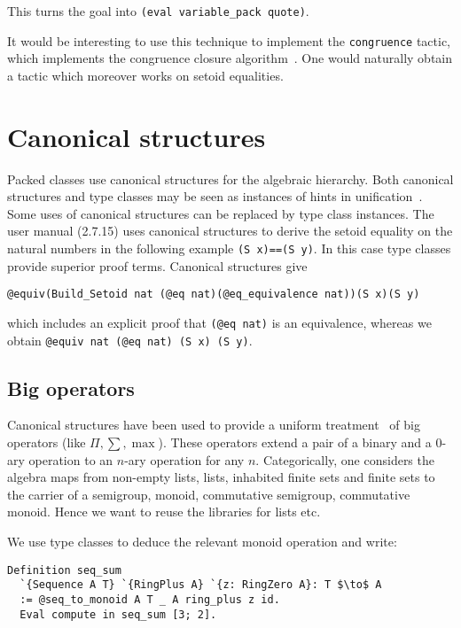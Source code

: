 \documentclass[a4paper,10pt,runningheads]{llncs}
\begin{document}
This turns the goal into \lstinline|(eval variable_pack quote)|.

It would be interesting to use this technique to implement the \lstinline|congruence| tactic, which implements
the congruence closure algorithm~\cite{corbineau2007deciding}. One would naturally obtain a tactic
which moreover works on setoid equalities.

\section{Canonical structures}\label{canonical}
Packed classes use canonical structures for the algebraic hierarchy. Both canonical structures and
type classes may be seen as instances of hints in unification~\cite{Hints}. Some uses of canonical
structures can be replaced by type class instances. The user manual (2.7.15) uses canonical
structures to derive the setoid equality on the natural
numbers in the following example \lstinline|(S x)==(S y)|. In this case type classes provide superior proof
terms. Canonical structures give
\begin{lstlisting}
@equiv(Build_Setoid nat (@eq nat)(@eq_equivalence nat))(S x)(S y)
\end{lstlisting}

which includes an explicit proof that \lstinline|(@eq nat)| is an equivalence,
whereas we obtain \lstinline|@equiv nat (@eq nat) (S x) (S y)|.

\subsection{Big operators}
Canonical structures have been used to provide a uniform treatment~\cite{bertot2008canonical} of big
operators (like $\Pi,\sum, \max$). These operators extend a pair of a binary and a 0-ary operation
to an $n$-ary operation for any $n$. Categorically, one considers the algebra maps from non-empty
lists, lists, inhabited finite sets and finite sets to the carrier of a semigroup, monoid,
commutative semigroup, commutative monoid. Hence we want to reuse the libraries for lists etc.

We use type classes to deduce the relevant monoid operation and write:
\begin{lstlisting}
Definition seq_sum
  `{Sequence A T} `{RingPlus A} `{z: RingZero A}: T $\to$ A
  := @seq_to_monoid A T _ A ring_plus z id.
  Eval compute in seq_sum [3; 2].
\end{lstlisting}
\end{document}
